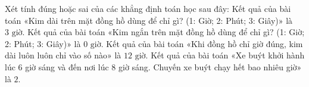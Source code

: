 \begin{ex} %
Xét tính đúng hoặc sai của các khẳng định toán học sau đây:
\choiceTF
{Kết quả của bài toán «Kim dài trên mặt đồng hồ dùng để chỉ gì? (1: Giờ; 2: Phút; 3: Giây)» là $3\text{ giờ}$.}
{Kết quả của bài toán «Kim ngắn trên mặt đồng hồ dùng để chỉ gì? (1: Giờ; 2: Phút; 3: Giây)» là $0\text{ giờ}$.}
{\True Kết quả của bài toán «Khi đồng hồ chỉ giờ đúng, kim dài luôn luôn chỉ vào số nào» là $12\text{ giờ}$.}
{\True Kết quả của bài toán «Xe buýt khởi hành lúc 6 giờ sáng và đến nơi lúc 8 giờ sáng. Chuyến xe buýt chạy hết bao nhiêu giờ» là $2$.}
\end{ex}


